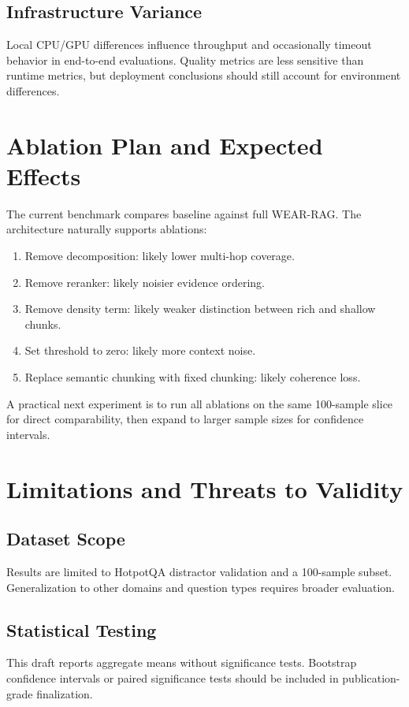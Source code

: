 \documentclass[10pt,draftclsnofoot,onecolumn,journal]{IEEEtran}
\begin{document}
\subsection{Infrastructure Variance}
Local CPU/GPU differences influence throughput and occasionally timeout behavior in end-to-end evaluations. Quality metrics are less sensitive than runtime metrics, but deployment conclusions should still account for environment differences.

\section{Ablation Plan and Expected Effects}
The current benchmark compares baseline against full WEAR-RAG. The architecture naturally supports ablations:
\begin{enumerate}
\item Remove decomposition: likely lower multi-hop coverage.
\item Remove reranker: likely noisier evidence ordering.
\item Remove density term: likely weaker distinction between rich and shallow chunks.
\item Set threshold to zero: likely more context noise.
\item Replace semantic chunking with fixed chunking: likely coherence loss.
\end{enumerate}

A practical next experiment is to run all ablations on the same 100-sample slice for direct comparability, then expand to larger sample sizes for confidence intervals.

\section{Limitations and Threats to Validity}
\subsection{Dataset Scope}
Results are limited to HotpotQA distractor validation and a 100-sample subset. Generalization to other domains and question types requires broader evaluation.

\subsection{Statistical Testing}
This draft reports aggregate means without significance tests. Bootstrap confidence intervals or paired significance tests should be included in publication-grade finalization.
\end{document}
